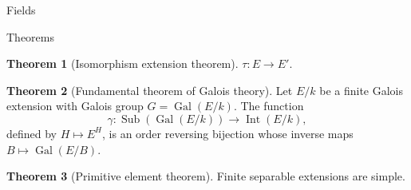 \documentclass{article}
\theoremstyle{definition}
\newtheorem{theorem}{Theorem}
\numberwithin{theorem}{subsection} %
\theoremstyle{definition}
\newcommand{\Gal}{\operatorname{Gal}}
\newcommand{\fn}[3]{{#1 \colon #2 \rightarrow #3}}
\begin{document}
\begin{section}{Fields}
\begin{subsection}{Theorems}
\begin{theorem}[Isomorphism extension theorem]
      $\fn \tau E E'$.
    \end{theorem}
    \begin{theorem}[Fundamental theorem of Galois theory] %
      Let $E/k$ be a finite Galois extension with Galois group $G = \Gal(E/k)$.
      The function \[
        \fn \gamma {\operatorname{Sub}(\Gal(E/k))} {\operatorname{Int}(E/k)},
      \]
      defined by $H \mapsto E^H$, is an order reversing bijection whose
      inverse maps ${B \mapsto \Gal(E/B)}$.
    \end{theorem}
    \begin{theorem}[Primitive element theorem]
      Finite separable extensions are simple.
    \end{theorem}
  \end{subsection}
\end{section}
\end{document}
